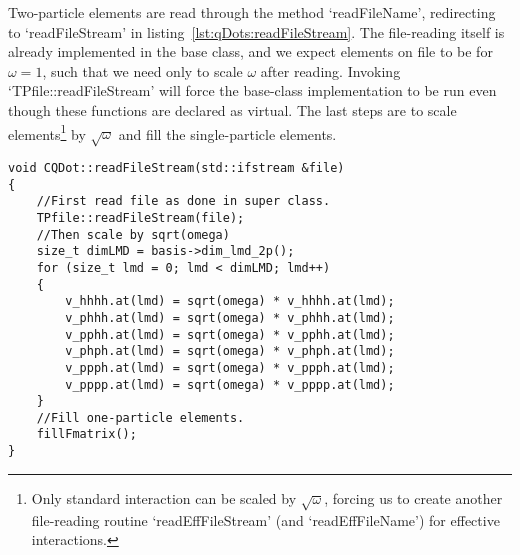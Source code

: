 Two-particle elements are read through the method `readFileName', redirecting to `readFileStream' in listing~\ref{lst:qDots:readFileStream}.
The file-reading itself is already implemented in the base class, and we expect elements on file to be for $\omega=1$, such that we need only to scale $\omega$ after reading.
Invoking `TPfile::readFileStream' will force the base-class implementation to be run even though these functions are declared as virtual.
The last steps are to scale elements\footnote{Only standard interaction can be scaled by $\sqrt{\omega}$, forcing us to create another file-reading routine `readEffFileStream' (and `readEffFileName') for effective interactions.} by $\sqrt{\omega}$ and fill the single-particle elements.
\begin{lstlisting}[float,label={lst:qDots:readFileStream},caption={How to read tp-elements for CQDot.}]
void CQDot::readFileStream(std::ifstream &file)
{
    //First read file as done in super class.
    TPfile::readFileStream(file);
    //Then scale by sqrt(omega)
    size_t dimLMD = basis->dim_lmd_2p();
    for (size_t lmd = 0; lmd < dimLMD; lmd++)
    {
        v_hhhh.at(lmd) = sqrt(omega) * v_hhhh.at(lmd);
        v_phhh.at(lmd) = sqrt(omega) * v_phhh.at(lmd);
        v_pphh.at(lmd) = sqrt(omega) * v_pphh.at(lmd);
        v_phph.at(lmd) = sqrt(omega) * v_phph.at(lmd);
        v_ppph.at(lmd) = sqrt(omega) * v_ppph.at(lmd);
        v_pppp.at(lmd) = sqrt(omega) * v_pppp.at(lmd);
    }
    //Fill one-particle elements.
    fillFmatrix();
}
\end{lstlisting}

